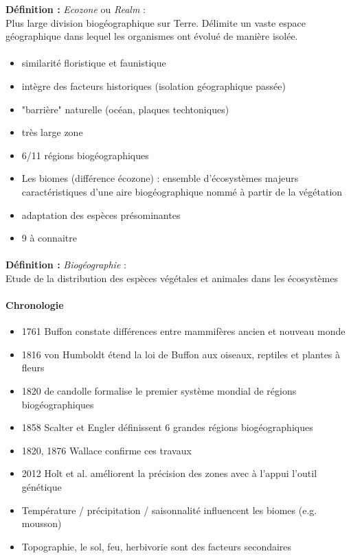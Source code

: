 \documentclass {article}
\begin{document}
\textbf{Définition :} \textit{Ecozone} ou \textit{Realm} :
\\ Plus large division biogéographique sur Terre. Délimite un vaste espace géographique dans lequel les organismes ont évolué de manière isolée.
\paragraph{}
\begin{itemize}
\item similarité floristique et faunistique
\item intègre des facteurs historiques (isolation géographique passée)
\item "barrière" naturelle (océan, plaques techtoniques)
\item très large zone
\item 6/11 régions biogéographiques
\\
\item Les biomes (différence écozone) : ensemble d'écosystèmes majeurs caractéristiques d'une aire biogéographique nommé à partir de la végétation
\item adaptation des espèces présominantes
\item 9 à connaitre
\end{itemize}

\paragraph{}
\textbf{Définition :} \textit{Biogéographie} :
\\ Etude de la distribution des espèces végétales et animales dans les écosystèmes

\paragraph{Chronologie}
\begin{itemize}
\item 1761 Buffon constate différences entre mammifères ancien et nouveau monde
\item 1816 von Humboldt étend la loi de Buffon aux oiseaux, reptiles et plantes à fleurs
\item 1820 de candolle formalise le premier système mondial de régions biogéographiques
\item 1858 Scalter et Engler définissent 6 grandes régions biogéographiques
\item 1820, 1876 Wallace confirme ces travaux
\item 2012 Holt et al. améliorent la précision des zones avec à l'appui l'outil génétique

\item Température / précipitation / saisonnalité influencent les biomes (e.g. mousson)
\item Topographie, le sol, feu, herbivorie sont des facteurs secondaires
\end{itemize}
\end{document}

